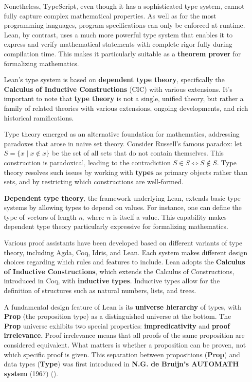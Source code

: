 Nonetheless, TypeScript, even though it has a sophisticated type system, cannot fully
capture complex mathematical properties. As well as for the most programming languages,
program specifications can only be enforced at runtime.
Lean, by contrast, uses a much more powerful type system that enables it to
express and verify mathematical statements with complete rigor fully during compilation time.
This makes it particularly suitable as a \textbf{theorem prover} for formalizing mathematics.

Lean's type system is based on \textbf{dependent type theory}, specifically the
\textbf{Calculus of Inductive Constructions} (CIC) with various extensions.
It's important to note that \textbf{type theory} is not a single, unified theory, but rather a family of
related theories with various extensions, ongoing developments, and rich historical ramifications.

Type theory emerged as an alternative foundation for mathematics, addressing paradoxes
that arose in naive set theory. Consider Russell's famous paradox:
let $S = \{x \mid x \notin x\}$ be the set of all sets that do not contain themselves.
This construction is paradoxical, leading to the contradiction $S \in S \iff S \notin S$.
Type theory resolves such issues by working with \textbf{types} as primary objects rather than sets,
and by restricting which constructions are well-formed.

\textbf{Dependent type theory}, the framework underlying Lean, extends basic type systems
by allowing types to depend on values. For instance, one can define the type of vectors
of length $n$, where $n$ is itself a value. This capability makes dependent type theory
particularly expressive for formalizing mathematics.

Various proof assistants have been developed based on different variants of type theory,
including Agda, Coq, Idris, and Lean. Each system makes different design choices regarding
which rules and features to include. Lean adopts the \textbf{Calculus of Inductive Constructions},
which extends the Calculus of Constructions, introduced in Coq, with \textbf{inductive types}.
Inductive types allow for the definition of structures
such as natural numbers, lists, and trees.

A fundamental design feature of Lean is its \textbf{universe hierarchy} of types, with \textbf{Prop}
(the proposition type) as a distinguished universe at the bottom.
The \textbf{Prop} universe exhibits two
special properties: \textbf{impredicativity} and \textbf{proof irrelevance}.
Proof irrelevance means that all proofs of the same proposition are considered equivalent. What matters
is whether a proposition can be proven, not which specific proof is given.
This separation between propositions (\textbf{Prop}) and data types (\textbf{Type}) was first
introduced in \textbf{N.G. de Bruijn's AUTOMATH system} (1967)
(\cite{thompson1999types}).

